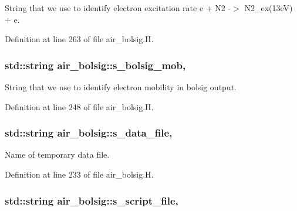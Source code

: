String that we use to identify electron excitation rate e + N2 -\/$>$ N2\+\_\+ex(13e\+V) + e. 



Definition at line 263 of file air\+\_\+bolsig.\+H.

\subsubsection[{\texorpdfstring{s\+\_\+bolsig\+\_\+mob}{s_bolsig_mob}}]{\setlength{\rightskip}{0pt plus 5cm}std\+::string air\+\_\+bolsig\+::s\+\_\+bolsig\+\_\+mob\hspace{0.3cm}{\ttfamily [static]}, {\ttfamily [protected]}}\hypertarget{classair__bolsig_adc7d5591aed0216b0838c6735e066235}{}\label{classair__bolsig_adc7d5591aed0216b0838c6735e066235}


String that we use to identify electron mobility in bolsig output. 



Definition at line 248 of file air\+\_\+bolsig.\+H.

\subsubsection[{\texorpdfstring{s\+\_\+data\+\_\+file}{s_data_file}}]{\setlength{\rightskip}{0pt plus 5cm}std\+::string air\+\_\+bolsig\+::s\+\_\+data\+\_\+file\hspace{0.3cm}{\ttfamily [static]}, {\ttfamily [protected]}}\hypertarget{classair__bolsig_a9b4fc9a13c1b01b14fc4cffbe0123fdf}{}\label{classair__bolsig_a9b4fc9a13c1b01b14fc4cffbe0123fdf}


Name of temporary data file. 



Definition at line 233 of file air\+\_\+bolsig.\+H.

\subsubsection[{\texorpdfstring{s\+\_\+script\+\_\+file}{s_script_file}}]{\setlength{\rightskip}{0pt plus 5cm}std\+::string air\+\_\+bolsig\+::s\+\_\+script\+\_\+file\hspace{0.3cm}{\ttfamily [static]}, {\ttfamily [protected]}}\hypertarget{classair__bolsig_a8390d532f700845dc66e53328004972f}{}\label{classair__bolsig_a8390d532f700845dc66e53328004972f}


